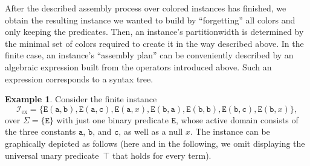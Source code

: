 \documentclass[10pt,a4paper]{amsart}
\theoremstyle{definition}
\newtheorem{exa}[exa]{Example}
\numberwithin{equation}{section}
\theoremstyle{plain}
\theoremstyle{definition}
\newtheorem{example}[example]{Example}
\theoremstyle{myexample}
\renewenvironment{example}%
{
	\begin{shaded*}	
		\vspace{-1.5ex}
		\begin{exa}%
		}{
		\end{exa}
		\vspace{-1.5ex}
	\end{shaded*}
}
\theoremstyle{plain}
\theoremstyle{definition}
\newcommand{\instance}{\mathcal{I}}
\newcommand{\ercwidth}{\partitionwidth}
\newcommand{\partitionwidth}{par\-ti\-tion\-width}
\newcommand{\pred}[1]{\mathtt{#1}}
\newcommand{\const}[1]{\mathtt{#1}}
\begin{document}
After the described assembly process over colored instances has finished, we obtain the resulting instance we wanted to build by ``forgetting'' all colors and only keeping the predicates. 
Then, an instance's \ercwidth{} is determined by the minimal set of colors required to create it in the way described above.
In the finite case, an instance's ``assembly plan'' can be conveniently described by an algebraic expression built from the operators introduced above. Such an expression corresponds to a syntax tree. 


\begin{example}\label{ex:pw1}
Consider the  finite instance 
$$\instance_\mathrm{ex}=\{%
\pred{E}(\const{a},\const{b}),\pred{E}(\const{a},\const{c}),\pred{E}(\const{a},x),\pred{E}(\const{b},\const{a}),\pred{E}(\const{b},\const{b}),\pred{E}(\const{b},\const{c}),\pred{E}(\const{b},x) \},$$%
over $\Sigma = \{\pred{E}\}$ with just one binary predicate $\pred{E}$, whose active domain consists of the three constants $\const{a}$, $\const{b}$, and $\const{c}$, as well as a null $x$. The instance can be graphically depicted as follows (here and in the following, we omit displaying the universal unary predicate~$\top$ that holds for every term).\\[-8ex] 

\begin{center}
\end{center}


\end{example}
\end{document}
